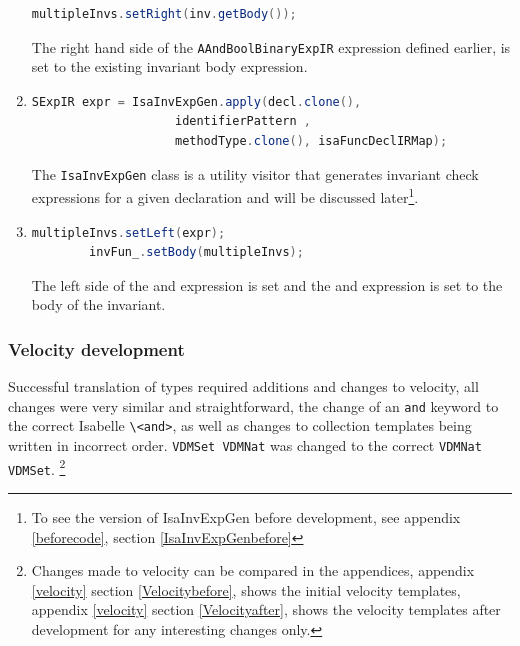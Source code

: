 \begin{enumerate}
\begin{lstlisting}[language=Java]
		multipleInvs.setRight(inv.getBody()); 
	    \end{lstlisting}
	    The right hand side of the \lstinline[language=Java]{AAndBoolBinaryExpIR} expression defined earlier, is set to the existing invariant body expression.
	    \item \begin{lstlisting}[language=Java]
	    SExpIR expr = IsaInvExpGen.apply(decl.clone(), 
					identifierPattern , 
					methodType.clone(), isaFuncDeclIRMap);
	    \end{lstlisting}
	    The \lstinline[language=Java]{IsaInvExpGen} class is a utility visitor that generates invariant check expressions for a given declaration and will be discussed later\footnote{To see the version of IsaInvExpGen before development, see appendix \ref{beforecode}, section \ref{IsaInvExpGenbefore}}.
	    \item \begin{lstlisting}[language=Java]
	    multipleInvs.setLeft(expr);
       	invFun_.setBody(multipleInvs);
	    \end{lstlisting}
	    The left side of the and expression is set and the and expression is set to the body of the invariant.
	\end{enumerate}

	\subsubsection{Velocity development}
	Successful translation of types required additions and changes to velocity, all changes were very similar and straightforward, the change of an \lstinline[language=Velocity]{and} keyword to the correct Isabelle \lstinline[language=Velocity]{\<and>}, as well as changes to collection templates being written in incorrect order. \lstinline[language=Velocity]{VDMSet VDMNat} was changed to the correct \lstinline[language=Velocity]{VDMNat VDMSet}. \footnote{Changes made to velocity can be compared in the appendices, appendix \ref{velocity} section \ref{Velocitybefore}, shows the initial velocity templates, appendix \ref{velocity} section \ref{Velocityafter}, shows the velocity templates after development for any interesting changes only.} 

